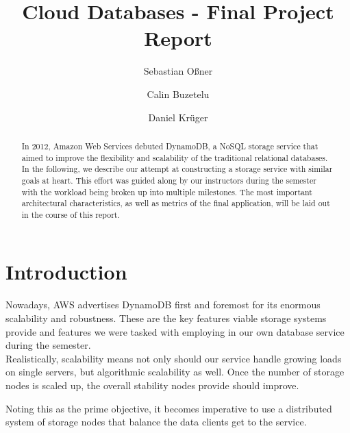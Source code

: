 \documentclass[sigconf]{acmart}
\begin{document}
\title{Cloud Databases - Final Project Report}

\author{Sebastian Oßner}

\author{Calin Buzetelu}

\author{Daniel Krüger}

\begin{abstract}
  In 2012, Amazon Web Services debuted DynamoDB, a NoSQL storage service that aimed to improve the flexibility and scalability of the traditional relational databases. In the following, we describe our attempt at constructing a storage service with similar goals at heart. This effort was guided along by our instructors during the semester with the workload being broken up into multiple milestones. The most important architectural characteristics, as well as metrics of the final application, will be laid out in the course of this report.
\end{abstract}


\maketitle
\pagestyle{plain}
\section{Introduction}
Nowadays, AWS advertises DynamoDB first and foremost for its enormous scalability and robustness.
These are the key features viable storage systems provide and features we were tasked with employing in our own database service during the semester. \\Realistically, scalability means not only should our service handle growing loads on single servers, but algorithmic scalability as well. Once the number of storage nodes is scaled up, the overall stability nodes provide should improve.

Noting this as the prime objective, it becomes imperative to use a distributed system of storage nodes that balance the data clients get to the service.
\end{document}

